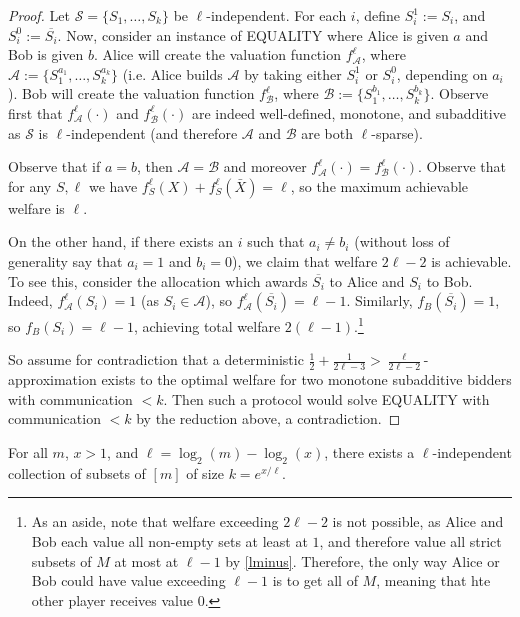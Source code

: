   \begin{proof} Let $\mathcal{S} = \{S_1,\ldots, S_k\}$ be $\ell$-independent. For
    each $i$, define $S_i^1:= S_i$, and $S_i^0 := \overline{S_i}$. Now, consider
    an instance of EQUALITY where Alice is given $a$ and Bob is given $b$. Alice
    will create the valuation function $f^\ell_\mathcal{A}$, where
    $\mathcal{A}:=\{S_1^{a_1},\ldots, S_k^{a_k}\}$ (i.e. Alice builds
    $\mathcal{A}$ by taking either $S_i^1$ or $S_i^0$, depending on $a_i$). Bob
    will create the valuation function $f^\ell_\mathcal{B}$, where
    $\mathcal{B}:=\{S_1^{b_1},\ldots, S_k^{b_k}\}$. Observe first that
    $f^\ell_\mathcal{A}(\cdot)$ and $f^\ell_\mathcal{B}(\cdot)$ are indeed
    well-defined, monotone, and subadditive as $\mathcal{S}$ is $\ell$-independent
    (and therefore $\mathcal{A}$ and $\mathcal{B}$ are both $\ell$-sparse). 

  Observe that if $a = b$, then $\mathcal{A} = \mathcal{B}$ and moreover
  $f^\ell_\mathcal{A}(\cdot) = f^\ell_\mathcal{B}(\cdot)$. Observe that for any
  $S, \ell$ we have $f_S^\ell(X) + f_S^\ell(\bar{X}) =\ell$, so the maximum
  achievable welfare is $\ell$.

  On the other hand, if there exists an $i$ such that $a_i \neq b_i$ (without loss
  of generality say that $a_i = 1$ and $b_i = 0$), we claim that welfare $2\ell-2$
  is achievable. To see this, consider the allocation which awards
  $\overline{S_i}$ to Alice and $S_i$ to Bob. Indeed, $f^\ell_\mathcal{A}(S_i) =
  1$ (as $S_i \in \mathcal{A}$), so $f^\ell_\mathcal{A}(\overline{S_i}) = \ell -
  1$. Similarly, $f_B(\overline{S_i}) = 1$, so $f_B(S_i) = \ell - 1$, achieving
  total welfare $2(\ell-1)$.\footnote{
    As an aside, note that welfare exceeding
    $2\ell-2$ is not possible, as Alice and Bob each value all non-empty sets at
    least at $1$, and therefore value all strict subsets of $M$ at most at $\ell-1$
    by \ref{lminus}. Therefore, the only way Alice or Bob could have value exceeding
    $\ell-1$ is to get all of $M$, meaning that hte other player receives value
    $0$. } 

  So assume for contradiction that a deterministic $\frac{1}{2} +
  \frac{1}{2\ell-3} > \frac{\ell}{2\ell-2}$-approximation exists to the optimal
  welfare for two monotone subadditive bidders with communication $< k$. Then such
  a protocol would solve EQUALITY with communication $<k$ by the reduction above,
  a contradiction.  \end{proof}

  \begin{lemma} \label{lem:l-indep-exist} For all $m$, $x > 1$, and $\ell =
  \log_2(m) - \log_2(x)$, there exists a $\ell$-independent collection of subsets
  of $[m]$ of size $k = e^{x/\ell}$.  \end{lemma}


